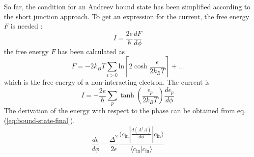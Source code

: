 So far, the condition for an Andreev bound state has been simplified according to the short junction approach. To get an expression for the current, the free energy $F$ is needed \cite{Beenakker1992}:
\begin{equation}
I = \frac{ 2 e}{\hbar} \frac{d F}{d \phi}
\end{equation}
the free energy $F$ has been calculated as \cite{Beenakker1991}
\begin{equation}
F = - 2 k_B T \sum_{\epsilon > 0 } \text{ln} \left[ 2 \cosh \frac{\epsilon}{2 k_B T}  \right] + \dots
\end{equation}
which is the free energy of a non-interacting electron. The current is
\begin{equation}
I = - \frac{2 e}{\hbar} \sum_p \tanh \left( \frac{\epsilon_p}{2 k_B T} \right) \frac{d \epsilon_p }{d \phi}
\end{equation}
The derivation of the energy with respect to the phase can be obtained from eq. (\ref{eq:bound-state-final}).
\begin{equation}
\frac{d \epsilon}{d \phi } = \frac{\Delta^2}{2 \epsilon} \frac{\langle c_\text{in} | \frac{d ( A^\dagger A )}{d \phi }| c_\text{in} \rangle} {\langle c_\text{in} |c_\text{in} \rangle}
\end{equation}



